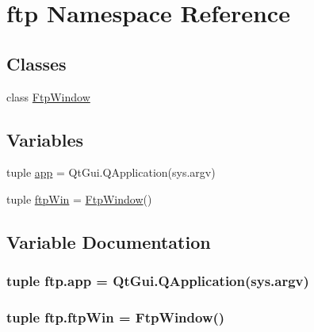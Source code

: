\hypertarget{namespaceftp}{}\section{ftp Namespace Reference}
\label{namespaceftp}
\subsection*{Classes}
\begin{DoxyCompactItemize}
\item 
class \hyperlink{classftp_1_1FtpWindow}{Ftp\+Window}
\end{DoxyCompactItemize}
\subsection*{Variables}
\begin{DoxyCompactItemize}
\item 
tuple \hyperlink{namespaceftp_aef2a0e0eb4c2f79ee9943dd2e7645a6f}{app} = Qt\+Gui.\+Q\+Application(sys.\+argv)
\item 
tuple \hyperlink{namespaceftp_a65ae3ad6b4945fcf24e23cff0c1acf8b}{ftp\+Win} = \hyperlink{classftp_1_1FtpWindow}{Ftp\+Window}()
\end{DoxyCompactItemize}


\subsection{Variable Documentation}
\hypertarget{namespaceftp_aef2a0e0eb4c2f79ee9943dd2e7645a6f}{}
\subsubsection[{app}]{\setlength{\rightskip}{0pt plus 5cm}tuple ftp.\+app = Qt\+Gui.\+Q\+Application(sys.\+argv)}\label{namespaceftp_aef2a0e0eb4c2f79ee9943dd2e7645a6f}
\hypertarget{namespaceftp_a65ae3ad6b4945fcf24e23cff0c1acf8b}{}
\subsubsection[{ftp\+Win}]{\setlength{\rightskip}{0pt plus 5cm}tuple ftp.\+ftp\+Win = {\bf Ftp\+Window}()}\label{namespaceftp_a65ae3ad6b4945fcf24e23cff0c1acf8b}
